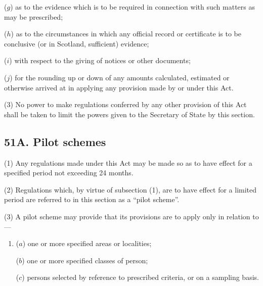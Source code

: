 \documentclass[a4paper]{article}
\begin{document}
\begin{enumerate}
($g$) as to the evidence which is to be required in connection with such matters
as may be prescribed;

($h$) as to the circumstances in which any official record or certificate is to be
conclusive (or in Scotland, sufficient) evidence;

($i$) with respect to the giving of notices or other documents;

($j$) for the rounding up or down of any amounts calculated, estimated or
otherwise arrived at in applying any provision made by or under this Act.
\end{enumerate}

(3)
No power to make regulations conferred by any other provision of this Act shall be taken to limit the powers given to the Secretary of State by this section.


\subsection{51A. Pilot schemes}

(1) Any regulations made under this Act may be made so as to have effect for a specified period not exceeding 24 months.

(2)
Regulations which, by virtue of subsection (1), are to have effect for a limited period are referred to in this section as a “pilot scheme”.

(3) A pilot scheme may provide that its provisions are to apply only in relation to---
\begin{enumerate}\item[]
($a$) one or more specified areas or localities;

($b$) one or more specified classes of person;

($c$) persons selected by reference to prescribed criteria, or on a sampling basis.
\end{enumerate}
\end{document}
